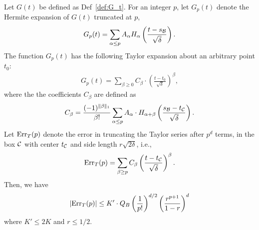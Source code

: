 \begin{lemma}\label{lem:fast_gaussian_lemma_3}
Let $G(t)$ be defined as Def~\ref{def:G_t}. For an integer $p$, let $G_{p}(t)$ denote the Hermite expansion of $G(t)$ truncated at $p$,
\begin{align*}
G_p(t) = \sum_{\alpha \leq p} A_{\alpha} H_{\alpha} \left( \frac{ t - s_{\cal B} }{ \sqrt{\delta} } \right).
\end{align*}
The function $G_p(t)$ has the following Taylor expansion about an arbitrary point $t_0$:
\begin{align*}
G_p(t) = \sum_{\beta \geq 0} C_{\beta} \cdot \left( \frac{ t - t_0 }{ \sqrt{\delta} } \right)^{\beta},
\end{align*}
where the the coefficients $C_{\beta}$ are defined as
\begin{align}\label{eq:def_C_beta}
C_{\beta}= \frac{ (-1)^{\| \beta \|_1} }{ \beta ! } \sum_{\alpha \leq p} A_{\alpha} \cdot H_{\alpha + \beta} \left( \frac{s_{\cal B} - t_{\cal C} }{ \sqrt{\delta} } \right).
\end{align}
Let $\mathrm{Err}_T(p)$ denote the error in truncating the Taylor series after $p^d$ terms, in the box ${\cal C}$ with center $t_{\cal C}$ and side length $r \sqrt{2\delta} $, i.e.,
\begin{align*}
\mathrm{Err}_T(p ) = \sum_{\beta \geq p} C_{\beta} \left( \frac{ t - t_{\cal C} }{ \sqrt{\delta} } \right)^{\beta}.
\end{align*}
Then, we have
\begin{align*}
| \mathrm{Err}_T(p) | \leq K' \cdot Q_B \left( \frac{1}{p !} \right)^{d/2} \left( \frac{r^{p+1}}{1-r} \right)^d
\end{align*}
where $K' \leq 2K$ and $r \leq 1/2$. 
\end{lemma}
